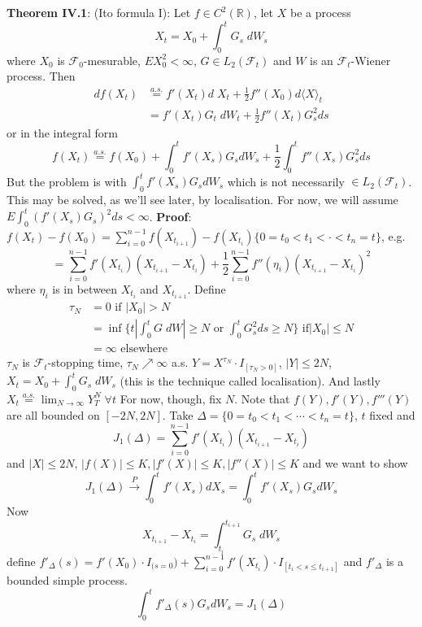 \documentclass[english]{article}
\newcommand{\R}{\mathbb{R}}
\newcommand{\note}[1]{\noindent\textbf{#1}}
\newcommand{\F}{\mathcal F}
\newcommand{\as}[1]{\stackrel {a.s.}{#1}}
\begin{document}
\note{Theorem IV.1}: (Ito formula I): Let $f\in C^2(\R)$, let $X$ be a process
$$X_t = X_0 + \int^t_0 G_s \; dW_s$$
where $X_0$ is $\F_0$-mesurable, $EX^2_0 <\infty$, $G\in L_2(\F_t)$ and $W$ is an $\F_t$-Wiener process. Then
\begin{align*}  df(X_t) & \as = f'(X_t) d\; X_t + \frac 12 f''(X_0) d\langle X \rangle_t\\
& =f'(X_t) G_t \; dW_t + \frac 12f'' (X_t) G^2_s ds
\end{align*}
or in the integral form
$$f(X_t) \as = f(X_0) + \int^t_0 f'(X_s) G_s dW_s + \frac 12 \int^t_0 f'' (X_s) G^2_s ds$$
But the problem is with $\int^t_0 f'(X_s) G_s dW_s$ which is not necessarily $\in L_2(\F_t)$. This may be solved, as we'll see later, by localisation. For now, we will assume $E\int^t_0 (f'(X_s) G_s)^2 ds < \infty$. \newline
\note{Proof}: $f(X_t) - f(X_0) = \sum^{n-1}_{i=0} f(X_{t_{i+1}}) - f(X_{t_i}) \{0=t_0 < t_1 < \cdot < t_n = t\}$, e.g. 
$$=\sum^{n-1}_{i=0} f'(X_{t_i}) (X_{t_{i+1}} - X_{t_{i}}) + \frac 12 \sum^{n-1}_{i=0} f''(\eta_i)(X_{t_{i+1}} - X_{t_{i}})^2$$
where $\eta_i$ is in between $X_{t_{i}}$ and $X_{t_{i+1}}$.\newline
Define 
\begin{align*} \tau_N &= 0\text{ if }|X_0| > N\\ & = \inf \{t |\int^t_0 G \; dW| \geq N \text{ or } \int^t_0 G^2_s ds \geq N \} \text{ if} |X_0| \leq N \\
&=\infty \text{ elsewhere}
\end{align*}
$\tau_N$ is $\F_t$-stopping time, $\tau_N \nearrow \infty$ a.s. \newline
$Y = X^{\tau_N} \cdot I_{[\tau_N > 0]}$, $|Y| \leq 2N$, $X_t = X_0 + \int^t_0 G_s \; dW_s$ (this is the technique called localisation). And lastly $X_t \as = \lim_{N\to \infty} Y^N_T \; \forall t$ \newline
For now, though, fix $N$. Note that $f(Y), f'(Y), f'''(Y)$ are all bounded on $[-2N, 2N]$. Take $\Delta = \{0 =t_0 < t_1 < \cdots < t_n = t\}$, $t$ fixed and
 $$J_1(\Delta) = \sum^{n-1}_{i=0} f'(X_{t_i}) (X_{t_{i+1}} - X_{t_i})$$
and $|X| \leq 2N$, $|f(X)| \leq K, |f'(X)| \leq K, |f''(X)| \leq K$ and we want to show
$$J_1(\Delta) \stackrel P\to \int^t_0 f'(X_s) dX_s = \int^t_0 f'(X_s) G_s dW_s$$
Now
$$X_{t_{i+1}} - X_{t_i} = \int^{t_{i+1}}_{t_i} G_s \; dW_s$$
define $f'_\Delta(s) = f'(X_0) \cdot I_{(s=0}) + \sum^{n-1}_{i=0} f'(X_{t_i}) \cdot I_{[t_i < s \leq t_{i+1}]}$ and $f'_\Delta$ is a bounded simple process.
$$\int^t_0 f'_\Delta (s) G_s dW_s = J_1(\Delta)$$
\end{document}
